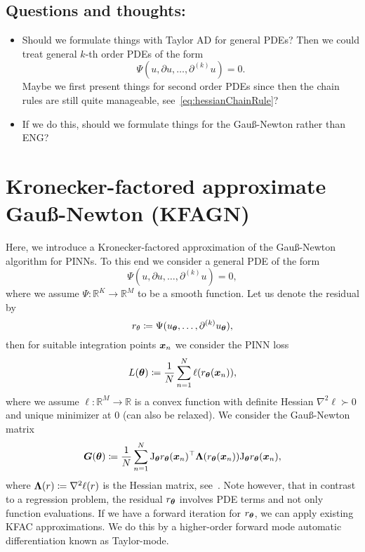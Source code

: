 \subsection{Questions and thoughts:}

\begin{itemize}
    \item Should we formulate things with Taylor AD for general PDEs? Then we could treat general $k$-th order PDEs of the form     
    \begin{equation*}
        \Psi(u, \partial u, \dots, \partial^{(k)} u) = 0. 
    \end{equation*}
    Maybe we first present things for second order PDEs since then the chain rules are still quite manageable, see~\eqref{eq:hessianChainRule}? 
    \item If we do this, should we formulate things for the Gauß-Newton rather than ENG?
\end{itemize}

\section{Kronecker-factored approximate Gauß-Newton (KFAGN)}
Here, we introduce a Kronecker-factored approximation of the Gauß-Newton algorithm for PINNs. 
To this end we consider a general PDE of the form
\begin{equation}
    \Psi(u, \partial u, \dots, \partial^{(k)} u) = 0,
\end{equation}
where we assume $\Psi\colon \mathbb R^K\to\mathbb R^M$ to be a smooth function.
Let us denote the residual by 
\begin{equation}
    r_\theta\coloneqq \Psi(u_{\bm{\theta}}, \dots, \partial^{(k)} u_{\bm{\theta}}),
\end{equation} 
then for suitable integration points ${\bm{x}}_n$ we consider the PINN loss
\begin{equation}
    L({\bm{\theta}})\coloneqq \frac1N\sum_{n=1}^N \ell(r_{{\bm{\theta}}}({\bm{x}}_n)),
\end{equation}
where we assume $\ell\colon\mathbb R^M\to\mathbb R$ is a convex function with definite Hessian $\nabla^2\ell\succ0$ and unique minimizer at $0$ (can also be relaxed). 
We consider the Gauß-Newton matrix
\begin{equation}
    {\bm{G}}({\bm{\theta}}) \coloneqq \frac1N\sum_{n=1}^N \mathrm{J}_{\bm{\theta}} r_{\bm{\theta}}({\bm{x}}_n)^\top {\bm{\Lambda}}(r_{\bm{\theta}}({\bm{x}}_n)) \mathrm{J}_{\bm{\theta}} r_{\bm{\theta}}({\bm{x}}_n),
\end{equation}
where ${\bm{\Lambda}}(r)\coloneqq \nabla^2 \ell(r)$ is the Hessian matrix, see~\cite{eschenhagen2023kroneckerfactored}. 
Note however, that in contrast to a regression problem, the residual $r_{\bm{\theta}}$ involves PDE terms and not only function evaluations. 
If we have a forward iteration for $r_{\bm{\theta}}$, we can apply existing KFAC approximations. 
We do this by a higher-order forward mode automatic differentiation known as Taylor-mode. 

